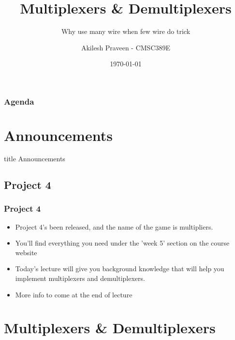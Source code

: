 \documentclass{beamer}
\title{Multiplexers \& Demultiplexers}
\subtitle{Why use many wire when few wire do trick}
\author[A Praveen]{Akilesh Praveen - CMSC389E}
\institute{UMD}
\date{\today}
\begin{document}
    \begin{frame}
        \titlepage
    \end{frame}
    
    \begin{frame}
        \frametitle{Agenda}
        \tableofcontents
    \end{frame}
    
    \section{Announcements}
    
        \begin{frame}
                \vfill
                \centering
                \begin{beamercolorbox}[sep=8pt,center,shadow=true,rounded=true]{title}
                    Announcements\par%
                \end{beamercolorbox}
                \vfill
             \end{frame}
    
        \subsection{Project 4}
        
            
            
            \begin{frame}
                \frametitle{Project 4}
                \begin{itemize}
                    \item Project 4's been released, and the name of the game is multipliers.
                    \item You'll find everything you need under the 'week 5' section on the course website
                    \item Today's lecture will give you background knowledge that will help you implement multiplexers and demultiplexers.
                    
                    \item More info to come at the end of lecture
                    
                \end{itemize}
            \end{frame}
            
    \section{Multiplexers \& Demultiplexers}
    
\end{document}
